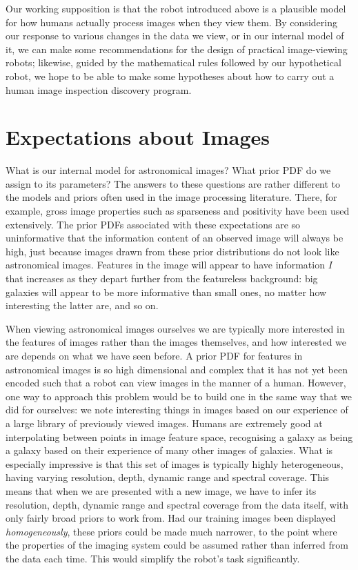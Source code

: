 \documentclass[letterpaper, 11pt]{article}
\begin{document}
Our working supposition is that the robot introduced above is a plausible
model for how humans actually process images when they view them.  By
considering our response to various changes in the data we view, or in our
internal model of it,  we can make some recommendations for the design of
practical image-viewing robots; likewise, guided by the mathematical rules
followed by our hypothetical robot, we hope to be able to make some hypotheses
about how to carry out a human image inspection discovery program.



\section{Expectations about Images}

What is our internal model for astronomical images? What prior PDF do we
assign to its parameters?  The answers to these questions are rather different
to the models and priors often used in the image processing literature. There,
for example, gross image properties such as sparseness and positivity have
been used extensively. The prior PDFs associated with these expectations are
so uninformative that the information content of an observed image will always
be high, just because images drawn from these prior distributions do not look
like astronomical images. Features in the image will appear to have 
information $I$ that increases as they depart further from the featureless
background: big galaxies will appear to be more informative  than small  ones,
no matter how interesting the latter are, and so on. 

When viewing astronomical images ourselves we are typically more interested in
the features of images rather than the images themselves, and how interested
we are depends on what we have seen before. A prior PDF for features in
astronomical images is so high dimensional and 
complex that it has not yet been encoded such that a robot can view images
in the manner of a human. However, one way to approach this problem
would be to build one in
the same way that we did for ourselves: we note interesting things in images
based on our experience of a large library of previously viewed images. Humans
are extremely good at interpolating between points in image feature space,
recognising a galaxy as being a galaxy based on their experience of many other
images of galaxies.  What is especially impressive is that this set of images
is typically highly heterogeneous, having varying resolution, depth, dynamic
range and spectral coverage. This means that when we are presented with a new
image, we have to infer its resolution, depth, dynamic range and  spectral
coverage from the data itself, with only fairly broad priors to work from. Had
our training images been displayed {\it homogeneously}, these priors could be
made much narrower, to the point where the properties of the imaging system
could be assumed rather than inferred from the data each time. This would
simplify the robot's task significantly.
\end{document}
